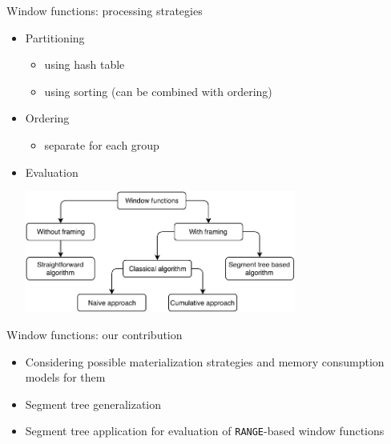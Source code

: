 \documentclass[compress, dvipsnames, unicode]{beamer}
\begin{document}
\begin{frame}{Window functions: processing strategies}
	\begin{itemize}
		\item Partitioning
		\begin{itemize}
			\item using hash table
			\item using sorting (can be combined with ordering)
		\end{itemize}
		\item Ordering
		\begin{itemize}
			\item separate for each group
		\end{itemize}
		\item Evaluation
		\begin{center}
			\includegraphics[width=0.7\textwidth]{window_functions_processing.pdf}
		\end{center}
		
	\end{itemize}
\end{frame}

\begin{frame}{Window functions: our contribution}
    \begin{itemize}
        \setlength\itemsep{1em}
        \item Considering possible materialization strategies and memory consumption models for them
        \item Segment tree generalization
        \item Segment tree application for evaluation of \texttt{RANGE}-based window functions
    \end{itemize}
    
    \let\thefootnote\relax{} 
\end{frame}
\end{document}
